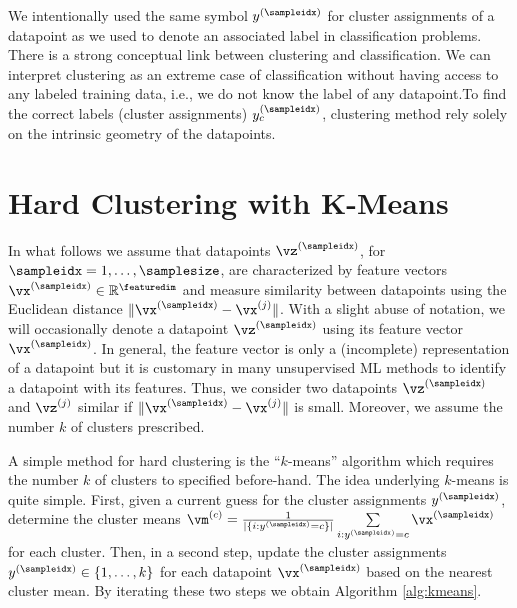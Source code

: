 \documentclass[12pt]{report}
\begin{document}
We intentionally used the same symbol $y^{(\sampleidx)}$ for 
cluster assignments of a datapoint as we used to denote an 
associated label in classification problems. There is a strong 
conceptual link between clustering and classification. We can 
interpret clustering as an extreme case of classification without 
having access to any labeled training data, i.e., we do not 
know the label of any datapoint.To find the correct labels 
(cluster assignments) $y_{c}^{(\sampleidx)}$, clustering method 
rely solely on the intrinsic geometry of the datapoints. 

\newpage
\section{Hard Clustering with K-Means}
\label{sec_hard_clustering}

In what follows we assume that datapoints $\vz^{(\sampleidx)}$, for $\sampleidx=1,\ldots,\samplesize$, 
are characterized by feature vectors $\vx^{(\sampleidx)} \in \mathbb{R}^{\featuredim}$ and measure 
similarity between datapoints using the Euclidean distance $\| \vx^{(\sampleidx)} - \vx^{(j)} \|$. 
With a slight abuse of notation, we will occasionally denote a datapoint $\vz^{(\sampleidx)}$ 
using its feature vector $\vx^{(\sampleidx)}$. In general, the feature vector 
is only a (incomplete) representation of a datapoint but it is customary in 
many unsupervised ML methods to identify a datapoint with its features.
Thus, we consider two datapoints $\vz^{(\sampleidx)}$ and $\vz^{(j)}$ 
similar if $\| \vx^{(\sampleidx)} - \vx^{(j)} \|$ is small. Moreover, we assume 
the number $k$ of clusters prescribed. 

A simple method for hard clustering is  the ``$k$-means'' algorithm 
which requires the number $k$ of clusters to specified before-hand. 
The idea underlying $k$-means is quite simple. First, given a current 
guess for the cluster assignments $y^{(\sampleidx)}$, determine the 
cluster means $\vm^{(c)} = \frac{1}{|\{i: y^{(\sampleidx)}= c\}|} \sum\limits_{i: y^{(\sampleidx)}=c} \vx^{(\sampleidx)}$ 
for each cluster. Then, in a second step, update the cluster assignments $y^{(\sampleidx)} \in \{1,\ldots,k\}$ 
for each datapoint $\vx^{(\sampleidx)}$ based on the nearest cluster 
mean. By iterating these two steps we obtain Algorithm \ref{alg:kmeans}. 
\end{document}

